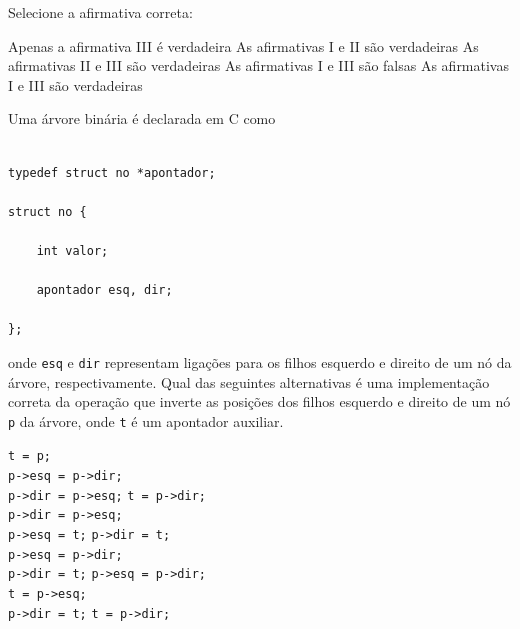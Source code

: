 \documentclass[12pt, addpoints]{exam}
\begin{document}
\begin{questions}
Selecione a afirmativa correta:
\begin{choices}
\choice Apenas a afirmativa III é verdadeira
\choice As afirmativas I e II são verdadeiras
\choice As afirmativas II e III são verdadeiras
\choice As afirmativas I e III são falsas
\choice As afirmativas I e III são verdadeiras
\end{choices}

\question

Uma árvore binária é declarada em C como



\begin{verbatim}

typedef struct no *apontador;

struct no {

    int valor;

    apontador esq, dir;

};

\end{verbatim}



onde \texttt{esq} e \texttt{dir} representam ligações para os filhos esquerdo e direito de um nó da árvore, respectivamente. Qual das seguintes alternativas é uma implementação correta da operação que inverte as posições dos filhos esquerdo e direito de um nó \texttt{p} da árvore, onde \texttt{t} é um apontador auxiliar.


\begin{choices}
\choice \texttt{t = p;} \\

          \texttt{p->esq = p->dir;} \\

          \texttt{p->dir = p->esq;}
\choice \texttt{t = p->dir;} \\

          \texttt{p->dir = p->esq;} \\

          \texttt{p->esq = t;}
\choice \texttt{p->dir = t;} \\

          \texttt{p->esq = p->dir;} \\

          \texttt{p->dir = t;}
\choice \texttt{p->esq = p->dir;} \\

          \texttt{t = p->esq;} \\

          \texttt{p->dir = t;}
\choice \texttt{t = p->dir;} \\


\end{choices}
\end{questions}
\end{document}
